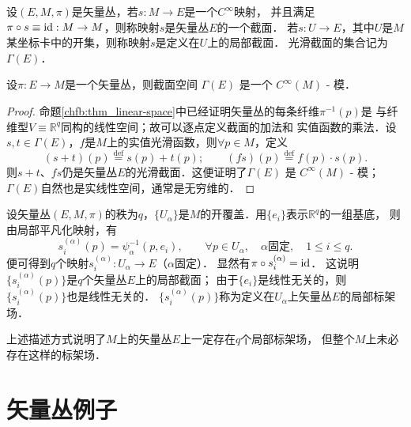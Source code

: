 
\begin{definition}\label{chfb:def_vf-section}
    设$(E,M,\pi)$是矢量丛，若$s:M\to E$是一个$C^\infty$映射，
    并且满足$\pi \circ s \equiv {\rm id} :M\to M$，则称映射$s$是矢量丛$E$的一个{\heiti 截面}．
    若$s:U\to E$，其中$U$是$M$某坐标卡中的开集，则称映射$s$是定义在$U$上的{\heiti 局部截面}．
    光滑截面的集合记为$\Gamma(E)$．
\end{definition}

\begin{proposition}
    设$\pi: E \rightarrow M$是一个矢量丛，则截面空间 $\Gamma(E)$ 是一个 $C^{\infty}(M)$ - 模．
\end{proposition}

\begin{proof}
    命题\ref{chfb:thm_linear-space}中已经证明矢量丛的每条纤维$\pi^{-1}(p)$是
    与纤维型$V\equiv \mathbb{R}^q$同构的线性空间；故可以逐点定义截面的加法和
    实值函数的乘法．设$s,t\in \Gamma(E)$，$f$是$M$上的实值光滑函数，则$\forall p\in M$，定义
    \begin{equation}\label{chfb:eqn_spt}
        (s+t)(p)\overset{\mathrm {def}}{=} s(p) + t(p);\qquad
        (fs)(p) \overset{\mathrm {def}}{=} f(p) \cdot s(p) .
    \end{equation}
    则$s+t$、$fs$仍是矢量丛$E$的光滑截面．这便证明了$\Gamma(E)$ 是 $C^{\infty}(M)$ - 模；
    $\Gamma(E)$自然也是实线性空间，通常是无穷维的．
\end{proof}

设矢量丛$(E,M,\pi)$的秩为$q$，$\{U_\alpha\}$是$M$的开覆盖．用$\{e_i\}$表示$\mathbb{R}^q$的一组基底，
则由局部平凡化映射，有
\begin{equation}\label{chfb:eqn_spsie}
    s_i^{(\alpha)}(p) = \psi^{-1}_{\alpha}(p, e_i),\qquad \forall p\in U_\alpha,
    \quad \alpha \text{固定}, \quad 1 \leqslant i \leqslant q.
\end{equation}
便可得到$q$个映射$s_i^{(\alpha)} : U_\alpha \to E$（$\alpha$固定）．
显然有$\pi \circ s_i^{(\alpha)} ={\rm id}$．
这说明$\{s_i^{(\alpha)}(p)\}$是$q$个矢量丛$E$上的局部截面；
由于$\{e_i\}$是线性无关的，则$\{s_i^{(\alpha)}(p)\}$也是线性无关的．
$\{s_i^{(\alpha)}(p)\}$称为定义在$U_\alpha$上矢量丛$E$的{\heiti 局部标架场}．

上述描述方式说明了$M$上的矢量丛$E$上一定存在$q$个局部标架场，
但整个$M$上未必存在这样的标架场．




\section{矢量丛例子}

